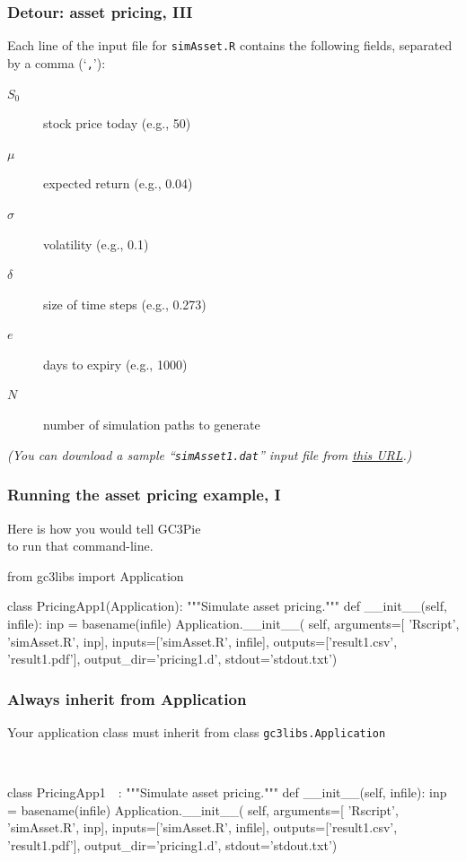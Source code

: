 \documentclass[english,serif,mathserif,xcolor=pdftex,dvipsnames,table]{beamer}
\begin{document}
\begin{frame}[fragile]
  \frametitle{Detour: asset pricing, III}

  Each line of the input file for \texttt{simAsset.R} contains the following
  fields, separated by a comma (`\texttt{,}'):
  \begin{description}
  \item[$S_0$] stock price today (e.g., 50)
  \item[$\mu$] expected return (e.g., 0.04)
  \item[$\sigma$] volatility (e.g., 0.1)
  \item[$\delta$] size of time steps (e.g., 0.273)
  \item[$e$] days to expiry (e.g., 1000)
  \item[$N$] number of simulation paths to generate
  \end{description}

  \+ \footnotesize
  {\em (You can download a sample ``\texttt{simAsset1.dat}'' input file from
    \href{https://raw.githubusercontent.com/riccardomurri/python-for-science-intro/master/download/}{this
      URL}.)}
\end{frame}


\begin{frame}[fragile]
\frametitle{Running the asset pricing example, I}

  Here is how you would tell GC3Pie \\ to run that command-line.

\begin{python}
from gc3libs import Application

class PricingApp1(Application):
  """Simulate asset pricing."""
  def __init__(self, infile):
    inp = basename(infile)
    Application.__init__(
      self,
      arguments=[
        'Rscript', 'simAsset.R', inp],
      inputs=['simAsset.R', infile],
      outputs=['result1.csv', 'result1.pdf'],
      output_dir='pricing1.d',
      stdout='stdout.txt')
\end{python}
\end{frame}


\begin{frame}[fragile]
\frametitle{Always inherit from Application}

  Your application class must inherit from class \texttt{gc3libs.Application}
  \+
\begin{python}
~~

class PricingApp1~~:
  """Simulate asset pricing."""
  def __init__(self, infile):
    inp = basename(infile)
    Application.__init__(
      self,
      arguments=[
        'Rscript', 'simAsset.R', inp],
      inputs=['simAsset.R', infile],
      outputs=['result1.csv', 'result1.pdf'],
      output_dir='pricing1.d',
      stdout='stdout.txt')
\end{python}
\end{frame}
\end{document}
